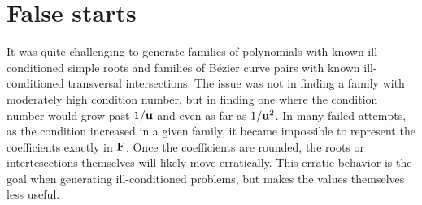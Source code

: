 \section{False starts}\label{sec:false-starts}

It was quite challenging to generate families of polynomials with known
ill-conditioned simple roots and families of B\'{e}zier curve pairs with known
ill-conditioned transversal intersections. The issue was not in finding a
family with moderately high condition number, but in finding one where the
condition number would grow past \(1 / \mathbf{u}\) and even as far as
\(1 / \mathbf{u}^2\). In many failed attempts, as the condition increased
in a given family, it became impossible to represent the
coefficients exactly in \(\mathbf{F}\). Once the coefficients are rounded,
the roots or intertesections themselves will likely move erratically.
This erratic behavior is the goal when generating ill-conditioned problems,
but makes the values themselves less useful.

